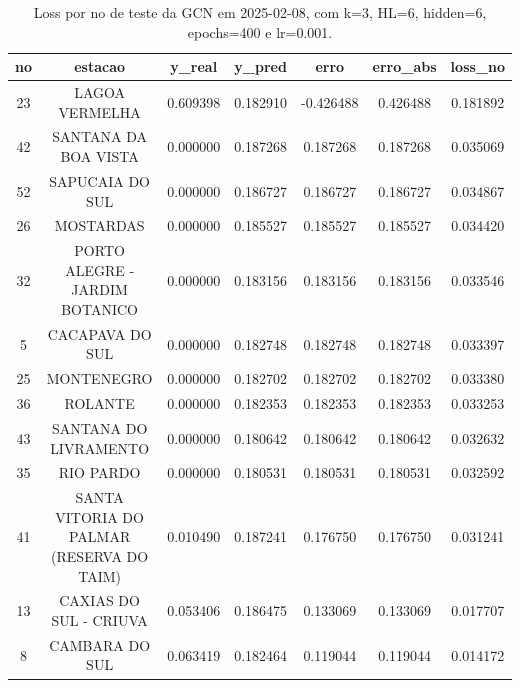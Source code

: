 \begin{table}[h]
\centering
\caption{Loss por no de teste da GCN em 2025-02-08, com k=3, HL=6, hidden=6, epochs=400 e lr=0.001.}
\label{tab:gcn_loss_k3_hl6_h6_e400_d20250208}
\begin{tabular}{ccccccc}
\toprule
no & estacao & y\_real & y\_pred & erro & erro\_abs & loss\_no \\
\midrule
23 & LAGOA VERMELHA & 0.609398 & 0.182910 & -0.426488 & 0.426488 & 0.181892 \\
42 & SANTANA DA BOA VISTA & 0.000000 & 0.187268 & 0.187268 & 0.187268 & 0.035069 \\
52 & SAPUCAIA DO SUL & 0.000000 & 0.186727 & 0.186727 & 0.186727 & 0.034867 \\
26 & MOSTARDAS & 0.000000 & 0.185527 & 0.185527 & 0.185527 & 0.034420 \\
32 & PORTO ALEGRE - JARDIM BOTANICO & 0.000000 & 0.183156 & 0.183156 & 0.183156 & 0.033546 \\
5 & CACAPAVA DO SUL & 0.000000 & 0.182748 & 0.182748 & 0.182748 & 0.033397 \\
25 & MONTENEGRO & 0.000000 & 0.182702 & 0.182702 & 0.182702 & 0.033380 \\
36 & ROLANTE & 0.000000 & 0.182353 & 0.182353 & 0.182353 & 0.033253 \\
43 & SANTANA DO LIVRAMENTO & 0.000000 & 0.180642 & 0.180642 & 0.180642 & 0.032632 \\
35 & RIO PARDO & 0.000000 & 0.180531 & 0.180531 & 0.180531 & 0.032592 \\
41 & SANTA VITORIA DO PALMAR (RESERVA DO TAIM) & 0.010490 & 0.187241 & 0.176750 & 0.176750 & 0.031241 \\
13 & CAXIAS DO SUL - CRIUVA & 0.053406 & 0.186475 & 0.133069 & 0.133069 & 0.017707 \\
8 & CAMBARA DO SUL & 0.063419 & 0.182464 & 0.119044 & 0.119044 & 0.014172 \\
\bottomrule
\end{tabular}
\end{table}
